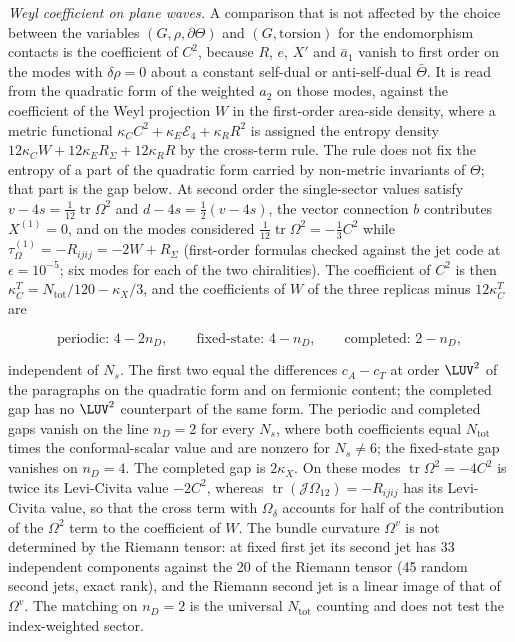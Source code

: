 \emph{Weyl coefficient on plane waves.} A comparison that is not affected by the choice between the variables \((G,\rho,\partial\Theta)\) and \((G,\text{torsion})\) for the endomorphism contacts is the coefficient of \(C^2\), because \(R\), \(e\), \(X'\) and \(\bar a_1\) vanish to first order on the modes with \(\delta\rho=0\) about a constant self-dual or anti-self-dual \(\bar\Theta\). It is read from the quadratic form of the weighted \(a_2\) on those modes, against the coefficient of the Weyl projection \(W\) in the first-order area-side density, where a metric functional \(\kappa_CC^2+\kappa_E\mathcal E_4+\kappa_RR^2\) is assigned the entropy density \(12\kappa_CW+12\kappa_ER_\Sigma+12\kappa_RR\) by the cross-term rule. The rule does not fix the entropy of a part of the quadratic form carried by non-metric invariants of \(\Theta\); that part is the gap below. At second order the single-sector values satisfy \(v-4s=\tfrac1{12}\operatorname{tr}\Omega^2\) and \(d-4s=\tfrac12(v-4s)\), the vector connection \(b\) contributes \(X^{(1)}=0\), and on the modes considered \(\tfrac1{12}\operatorname{tr}\Omega^2=-\tfrac13C^2\) while \(\tau_\Omega^{(1)}=-R_{ijij}=-2W+R_\Sigma\) (first-order formulas checked against the jet code at \(\epsilon=10^{-5}\); six modes for each of the two chiralities). The coefficient of \(C^2\) is then \(\kappa_C^T=N_{\mathrm{tot}}/120-\kappa_X/3\), and the coefficients of \(W\) of the three replicas minus \(12\kappa_C^T\) are

\[

  \text{periodic: }4-2n_D,\qquad \text{fixed-state: }4-n_D,\qquad \text{completed: }2-n_D,

\]

independent of \(N_s\). The first two equal the differences \(c_A-c_T\) at order \(\LUV^2\) of the paragraphs on the quadratic form and on fermionic content; the completed gap has no \(\LUV^2\) counterpart of the same form. The periodic and completed gaps vanish on the line \(n_D=2\) for every \(N_s\), where both coefficients equal \(N_{\mathrm{tot}}\) times the conformal-scalar value and are nonzero for \(N_s\neq6\); the fixed-state gap vanishes on \(n_D=4\). The completed gap is \(2\kappa_X\). On these modes \(\operatorname{tr}\Omega^2=-4C^2\) is twice its Levi-Civita value \(-2C^2\), whereas \(\operatorname{tr}(\mathcal J\Omega_{12})=-R_{ijij}\) has its Levi-Civita value, so that the cross term with \(\Omega_\delta\) accounts for half of the contribution of the \(\Omega^2\) term to the coefficient of \(W\). The bundle curvature \(\Omega^v\) is not determined by the Riemann tensor: at fixed first jet its second jet has 33 independent components against the 20 of the Riemann tensor (45 random second jets, exact rank), and the Riemann second jet is a linear image of that of \(\Omega^v\). The matching on \(n_D=2\) is the universal \(N_{\mathrm{tot}}\) counting and does not test the index-weighted sector.



